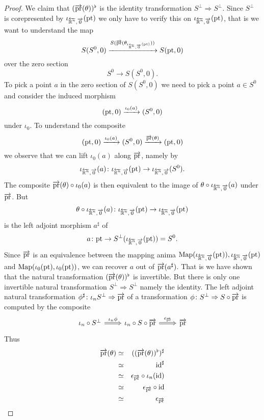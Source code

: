 \begin{proof}
    We claim that $(\overrightarrow{\mathrm{pr}}(\theta))^\flat$ is the identity transformation $S^\perp \Rightarrow S^\perp$.
    Since $S^\perp$ is corepresented by $\iota_{\overleftarrow{\mathbb{R}^n},\overrightarrow{0}}(\mathrm{pt})$ we only have to verify this on $\iota_{\overleftarrow{\mathbb{R}^n},\overrightarrow{0}}(\mathrm{pt})$, that is 
    we want to understand the map
    \[
    S(S^0, 0) \xrightarrow{S(\overrightarrow{\mathrm{pr}}(\theta_{\iota_{\overleftarrow{\mathbb{R}^n},\overrightarrow{0}}(\mathrm{pt})}))} S(\mathrm{pt}, 0)
    \]
    over the zero section 
    \[
    S^0 \to S(S^0, 0).
    \]
    To pick a point $a$ in the zero section of $S(S^0, 0)$ we need to pick a point $a \in S^0$
    and consider the induced morphism 
    \[
        (\mathrm{pt},0) \xrightarrow{\iota_0(a)} (S^0,0)
    \]
    under $\iota_0$.
    To understand the composite 
    \[
        (\mathrm{pt},0) \xrightarrow{\iota_0(a)} (S^0,0) \xrightarrow{\overrightarrow{\mathrm{pr}}(\theta)} (\mathrm{pt}, 0)
    \]
    we observe that we can lift $\iota_0(a)$ along $\overrightarrow{\mathrm{pr}}$, namely by 
    \[
      \iota_{\overleftarrow{\mathbb{R}^n},\overrightarrow{0}}(a) \colon \iota_{\overleftarrow{\mathbb{R}^n},\overrightarrow{0}}(\mathrm{pt}) \to \iota_{\overleftarrow{\mathbb{R}^n},\overrightarrow{0}}(S^0).  
    \]
    The composite $\overrightarrow{\mathrm{pr}}(\theta) \circ \iota_0(a)$ is then equivalent to the image 
    of $\theta \circ \iota_{\overleftarrow{\mathbb{R}^n},\overrightarrow{0}}(a)$ under $\overrightarrow{\mathrm{pr}}$.
    But 
    \[
        \theta \circ \iota_{\overleftarrow{\mathbb{R}^n},\overrightarrow{0}}(a) \colon \iota_{\overleftarrow{\mathbb{R}^n},\overrightarrow{0}}(\mathrm{pt}) \to \iota_{\overleftarrow{\mathbb{R}^n},\overrightarrow{0}}(\mathrm{pt}) 
    \]
    is the left adjoint morphism $a^\sharp$ of 
    \[
      a \colon \mathrm{pt} \to S^\perp(\iota_{\overleftarrow{\mathbb{R}^n},\overrightarrow{0}}(\mathrm{pt})) = S^0.  
    \]
    Since $\overrightarrow{\mathrm{pr}}$ is an equivalence between the mapping anima $\operatorname{Map}(\iota_{\overleftarrow{\mathbb{R}^n},\overrightarrow{0}}(\mathrm{pt})), \iota_{\overleftarrow{\mathbb{R}^n},\overrightarrow{0}}(\mathrm{pt})$ 
    and $\operatorname{Map}(\iota_0(\mathrm{pt}), \iota_0(\mathrm{pt}))$, we can recover $a$ out of $\overrightarrow{\mathrm{pr}}(a^\sharp)$.
    That is we have shown that the natural transformation $(\overrightarrow{\mathrm{pr}}(\theta))^\flat$ is invertible. 
    But there is only one invertible natural transformation $S^\perp \Rightarrow S^\perp$ namely the identity.
    The left adjoint natural transformation $\phi^\sharp \colon \iota_n S^\perp \Rightarrow \overrightarrow{\mathrm{pr}}$ of
    a transformation $\phi \colon S^\perp \Rightarrow S \circ \overrightarrow{\mathrm{pr}}$ is computed by the composite 
    \[\begin{tikzcd}
        {\iota_n\circ S^\perp} & {\iota_n \circ S \circ \overrightarrow{\pr}} & {\overrightarrow{\pr}}
        \arrow["{\iota_n \phi}", Rightarrow, from=1-1, to=1-2]
        \arrow["{\epsilon_{\overrightarrow{\pr}}}", Rightarrow, from=1-2, to=1-3]
    \end{tikzcd}\]
    Thus 
    \begin{eqnarray*}
        \overrightarrow{\mathrm{pr}}(\theta) & \simeq & ((\overrightarrow{\mathrm{pr}}(\theta))^\flat)^\sharp \\
        & \simeq & \mathrm{id}^\sharp \\
        & \simeq & \epsilon_{\overrightarrow{\mathrm{pr}}} \circ \iota_n(\mathrm{id}) \\
        & \simeq & \epsilon_{\overrightarrow{\mathrm{pr}}} \circ \mathrm{id} \\ 
        & \simeq & \epsilon_{\overrightarrow{\mathrm{pr}}}
    \end{eqnarray*}  
\end{proof}
